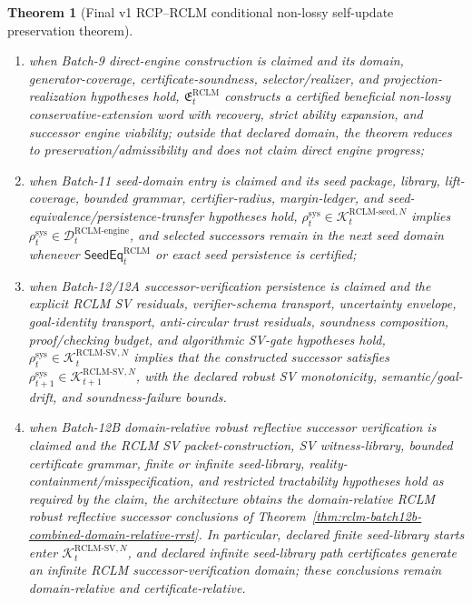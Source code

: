 \documentclass[11pt,a4paper]{article}
\newtheorem{theorem}{Theorem}[section]
\newcommand{\Kcal}{\mathcal K}
\newcommand{\Dcal}{\mathcal D}
\newcommand{\RCLM}{\mathrm{RCLM}}
\newcommand{\sys}{\mathrm{sys}}
\newcommand{\engine}{\mathrm{engine}}
\begin{document}
\begin{theorem}[Final v1 RCP--RCLM conditional non-lossy self-update preservation theorem]
\begin{enumerate}[label=(\roman*),leftmargin=1.5em]
    \item when Batch-9 direct-engine construction is claimed and its domain, generator-coverage, certificate-soundness, selector/realizer, and projection-realization hypotheses hold, \(\mathfrak E_t^{\RCLM}\) constructs a certified beneficial non-lossy conservative-extension word with recovery, strict ability expansion, and successor engine viability; outside that declared domain, the theorem reduces to preservation/admissibility and does not claim direct engine progress;
    \item when Batch-11 seed-domain entry is claimed and its seed package, library, lift-coverage, bounded grammar, certifier-radius, margin-ledger, and seed-equivalence/persistence-transfer hypotheses hold, \(\rho_t^{\sys}\in\Kcal_t^{\RCLM\text{-}\mathrm{seed},N}\) implies \(\rho_t^{\sys}\in\Dcal_t^{\RCLM\text{-}\engine}\), and selected successors remain in the next seed domain whenever \(\mathsf{SeedEq}_t^{\RCLM}\) or exact seed persistence is certified;
    \item when Batch-12/12A successor-verification persistence is claimed and the explicit RCLM SV residuals, verifier-schema transport, uncertainty envelope, goal-identity transport, anti-circular trust residuals, soundness composition, proof/checking budget, and algorithmic SV-gate hypotheses hold, \(\rho_t^{\sys}\in\Kcal_t^{\RCLM\text{-}\mathrm{SV},N}\) implies that the constructed successor satisfies \(\rho_{t+1}^{\sys}\in\Kcal_{t+1}^{\RCLM\text{-}\mathrm{SV},N}\), with the declared robust SV monotonicity, semantic/goal-drift, and soundness-failure bounds.

    \item when Batch-12B domain-relative robust reflective successor verification is claimed and the RCLM SV packet-construction, SV witness-library, bounded certificate grammar, finite or infinite seed-library, reality-containment/misspecification, and restricted tractability hypotheses hold as required by the claim, the architecture obtains the domain-relative RCLM robust reflective successor conclusions of Theorem~\ref{thm:rclm-batch12b-combined-domain-relative-rrst}. In particular, declared finite seed-library starts enter \(\Kcal_t^{\RCLM\text{-}\mathrm{SV},N}\), and declared infinite seed-library path certificates generate an infinite RCLM successor-verification domain; these conclusions remain domain-relative and certificate-relative.
\end{enumerate}
\end{theorem}
\end{document}
